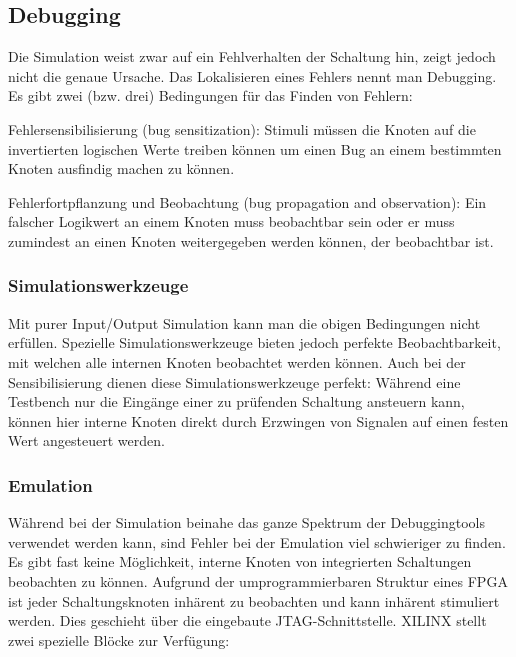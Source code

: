 \subsection{Debugging}$~$ \\
Die Simulation weist zwar auf ein Fehlverhalten der Schaltung hin, zeigt jedoch nicht die genaue Ursache. Das Lokalisieren eines Fehlers nennt man Debugging.\\
Es gibt zwei (bzw. drei) Bedingungen für das Finden von Fehlern:
\begin{compactitem}
    \item Fehlersensibilisierung (bug sensitization): Stimuli müssen die Knoten auf die invertierten logischen Werte treiben können um einen Bug an einem bestimmten Knoten ausfindig machen zu können.
    \item Fehlerfortpflanzung und Beobachtung (bug propagation and observation): Ein falscher Logikwert an einem Knoten muss beobachtbar sein oder er muss zumindest an einen Knoten weitergegeben werden können, der beobachtbar ist.
\end{compactitem}

\subsubsection{Simulationswerkzeuge}
Mit purer Input/Output Simulation kann man die obigen Bedingungen nicht erfüllen. Spezielle Simulationswerkzeuge bieten jedoch perfekte Beobachtbarkeit, mit welchen alle internen Knoten beobachtet werden können. Auch bei der Sensibilisierung dienen diese Simulationswerkzeuge perfekt: Während eine Testbench nur die Eingänge einer zu prüfenden Schaltung ansteuern kann, können hier interne Knoten direkt durch Erzwingen von Signalen auf einen festen Wert angesteuert werden.

\subsubsection{Emulation}
Während bei der Simulation beinahe das ganze Spektrum der Debuggingtools verwendet werden kann, sind Fehler bei der Emulation viel schwieriger zu finden. Es gibt fast keine Möglichkeit, interne Knoten von integrierten Schaltungen beobachten zu können. Aufgrund der umprogrammierbaren Struktur eines FPGA ist jeder Schaltungsknoten inhärent zu beobachten und kann inhärent stimuliert werden. Dies geschieht über die eingebaute JTAG-Schnittstelle. XILINX stellt zwei spezielle Blöcke zur Verfügung:

